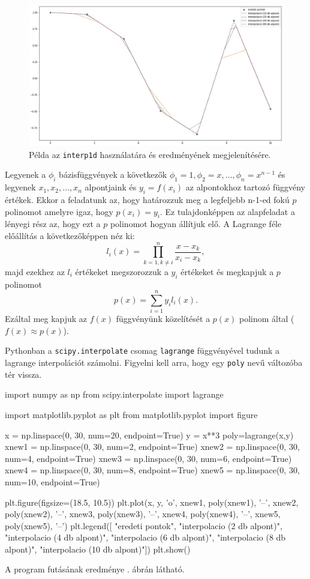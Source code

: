 \begin{figure}[h!]
\centering
\includegraphics[width=\textwidth]{img/interpolate3.png}
\caption{Példa az \texttt{interp1d} használatára és eredményének megjelenítésére.}
\label{fig:interpolate3}
\end{figure}


    Legyenek a \(\phi_i\) bázisfüggvények a következők
\(\phi_1=1, \phi_2=x, \dots , \phi_n=x^{n-1}\) és legyenek
\(x_1, x_2,\dots, x_n\) alpontjaink és \(y_i=f(x_i)\) az alpontokhoz
tartozó függvény értékek. Ekkor a feladatunk az, hogy határozzuk meg a
legfeljebb n-1-ed fokú \(p\) polinomot amelyre igaz, hogy
\(p(x_i) = y_i\). Ez tulajdonképpen az alapfeladat a lényegi rész az, hogy
ezt a \(p\) polinomot hogyan állítjuk elő. A Lagrange féle előállítás a
következőképpen néz ki:
    \[
l_i(x)=\prod_{k=1, k\neq i}^n\frac{x-x_k}{x_i-x_k},
\]
majd ezekhez az \(l_i\) értékeket megszorozzuk a \(y_i\) értékeket és
megkapjuk a \(p\) polinomot
\[
p(x)=\sum_{i=1}^n y_il_i(x).
\]
Ezáltal meg kapjuk az \(f(x)\) függvényünk közelítését a \(p(x)\)
polinom által (\(f(x) \approx p(x)\)).

    Pythonban a \texttt{scipy.interpolate} csomag \texttt{lagrange} függvényével
tudunk a lagrange interpolációt számolni. Figyelni kell arra, hogy egy \texttt{poly}
nevű változóba tér vissza.
\begin{python}
import numpy as np
from scipy.interpolate import lagrange

import matplotlib.pyplot as plt
from matplotlib.pyplot import figure

x = np.linspace(0, 30, num=20, endpoint=True)
y = x**3
poly=lagrange(x,y)
xnew1 = np.linspace(0, 30, num=2, endpoint=True)
xnew2 = np.linspace(0, 30, num=4, endpoint=True)
xnew3 = np.linspace(0, 30, num=6, endpoint=True)
xnew4 = np.linspace(0, 30, num=8, endpoint=True)
xnew5 = np.linspace(0, 30, num=10, endpoint=True)

plt.figure(figsize=(18.5, 10.5))
plt.plot(x, y, 'o',
    xnew1, poly(xnew1), '--',
    xnew2, poly(xnew2), '--',
    xnew3, poly(xnew3), '--',
    xnew4, poly(xnew4), '--',
    xnew5, poly(xnew5), '--')
plt.legend([
    "eredeti pontok",
    "interpolacio (2 db alpont)",
    "interpolacio (4 db alpont)",
    "interpolacio (6 db alpont)",
    "interpolacio (8 db alpont)",
    "interpolacio (10 db alpont)"])
plt.show()
\end{python}
A program futásának eredménye . ábrán látható.

